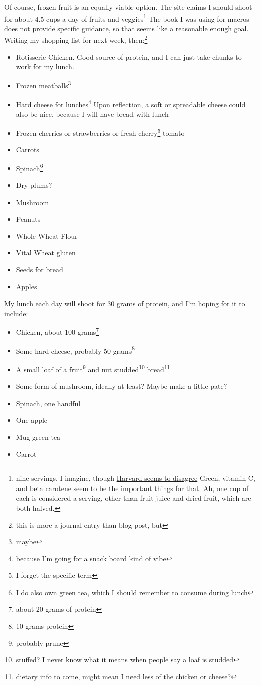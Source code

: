 \documentclass[12pt]{article}[titlepage]
\renewcommand{\,}{\textsuperscript{,}}
\begin{document}
Of course, frozen fruit is an equally viable option.  
The site claims I should shoot for about 4.5 cups a day of fruits and veggies\footnote{nine servings, I imagine, though \href{https://www.health.harvard.edu/nutrition/how-many-fruits-and-vegetables-do-we-really-need}{Harvard seems to disagree} Green, vitamin C, and beta carotene seem to be the important things for that. Ah, one cup of each is considered a serving, other than fruit juice and dried fruit, which are both halved.}  
The book I was using for macros does not provide specific guidance, so that seems like a reasonable enough goal.  
Writing my shopping list for next week, then:\footnote{this is more a journal entry than blog post, but}  


\begin{itemize}  
\item Rotisserie Chicken. Good source of protein, and I can just take chunks to work for my lunch.  
\item Frozen meatballs\footnote{maybe}  
\item Hard cheese for lunches\footnote{because I'm going for a snack board kind of vibe}  
Upon reflection, a soft or spreadable cheese could also be nice, because I will have bread with lunch  
\item Frozen cherries or strawberries or fresh cherry\footnote{I forget the specific term} tomato  
\item Carrots  
\item Spinach\footnote{I do also own green tea, which I should remember to consume during lunch}  
\item Dry plums?  
\item Mushroom  
\item Peanuts  
\item Whole Wheat Flour  
\item Vital Wheat gluten  
\item Seeds for bread  
\item Apples  
\end{itemize}

My lunch each day will shoot for 30 grams of protein, and I'm hoping for it to include:  
\begin{itemize}  
\item Chicken, about 100 grams\footnote{about 20 grams of protein}  
\item Some \href{https://fdc.nal.usda.gov/food-details/328637/nutrients}{hard cheese}, probably 50 grams\footnote{10 grams protein}  
\item A small loaf of a fruit\footnote{probably prune} and nut studded\footnote{stuffed? I never know what it means when people say a loaf is studded} bread\footnote{dietary info to come, might mean I need less of the chicken or cheese?}  
\item Some form of mushroom, ideally at least? Maybe make a little pate?  
\item Spinach, one handful  
\item One apple  
\item Mug green tea  
\item Carrot  
\end{itemize}
\end{document}
